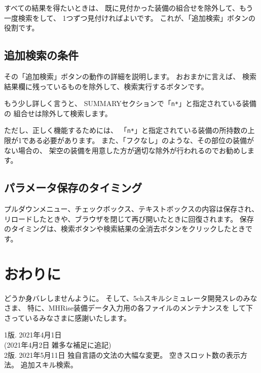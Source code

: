 \documentclass[dvipdfmx]{jsarticle}
\begin{document}
すべての結果を得たいときは、
既に見付かった装備の組合せを除外して、もう一度検索をして、
1つずつ見付ければよいです。
これが、「追加検索」ボタンの役割です。

\subsection{追加検索の条件}
その「追加検索」ボタンの動作の詳細を説明します。
おおまかに言えば、
検索結果欄に残っているものを除外して、検索実行するボタンです。

もう少し詳しく言うと、
SUMMARYセクションで「\texttt{n*}」と指定されている装備の
組合せは除外して検索します。

ただし、正しく機能するためには、
「\texttt{n*}」と指定されている装備の所持数の上限が1である必要があります。
また、「フクなし」のような、その部位の装備がない場合の、
架空の装備を用意した方が適切な除外が行われるのでお勧めします。

\subsection{パラメータ保存のタイミング}
プルダウンメニュー、チェックボックス、テキストボックスの内容は保存され、
リロードしたときや、ブラウザを閉じて再び開いたときに回復されます。
保存のタイミングは、検索ボタンや検索結果の全消去ボタンをクリックしたときです。

\section{おわりに} %
どうか身バレしませんように。
そして、5chスキルシミュレータ開発スレのみなさま、
特に、MHRise装備データ入力用の各ファイルのメンテナンスを
して下さっているみなさまに感謝いたします。

\bigskip

\noindent
1版. 2021年4月1日\\
\quad (2021年4月2日 雑多な補足に追記)
\\
2版. 2021年5月11日
\quad
独自言語の文法の大幅な変更。
空きスロット数の表示方法。
追加スキル検索。
\end{document}

